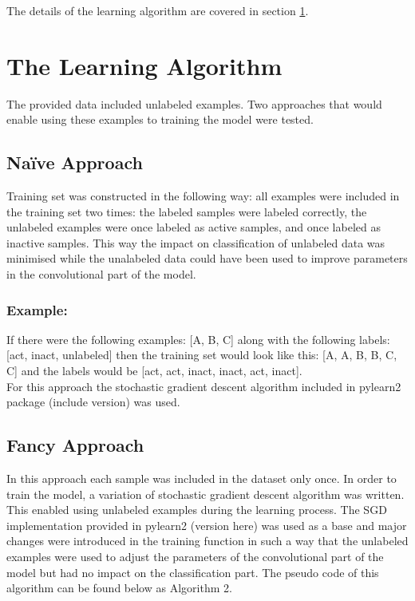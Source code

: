 \documentclass[a4paper,10pt]{report}
\begin{document}
	The details of the learning algorithm are covered in section \ref{sec:learning_algorithm}.	
	
      
    \section{The Learning Algorithm}\label{sec:learning_algorithm} 
    The provided data included unlabeled examples. Two approaches that would enable using these examples to training the model were tested.\\
    
      \subsection{Na\"{i}ve Approach}
      Training set was constructed in the following way: all examples were included in the training set two times: the labeled samples were labeled correctly, the unlabeled examples were once labeled as active samples, and once labeled as inactive samples. This way the impact on classification of unlabeled data was minimised while the unalabeled data could have been used to improve parameters in the convolutional part of the model.\\
	  
      \subsubsection{Example:}
      If there were the following examples: [A, B, C] along with the following labels: [act, inact, unlabeled] then the training set would look like this: [A, A, B, B, C, C] and the labels would be [act, act, inact, inact, act, inact].\\
      
      For this approach the stochastic gradient descent algorithm included in pylearn2 package (include version) was used.\\
	  
      \subsection{Fancy Approach}
      In this approach each sample was included in the dataset only once. In order to train the model, a variation of stochastic gradient descent algorithm was written. This enabled using unlabeled examples during the learning process. The SGD implementation provided in pylearn2 (version here) was used as a base and major changes were introduced in the training function in such a way that the unlabeled examples were used to adjust the parameters of the convolutional part of the model but had no impact on the classification part. The pseudo code of this algorithm can be found below as Algorithm 2.\\
      
\end{document}
